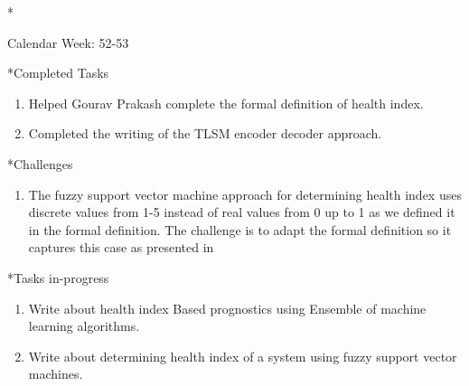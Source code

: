 \documentclass[11pt,a4paper]{article}
\begin{document}
\newpage
\begin{section}*{Calendar Week: 52-53 \hfill \date{30 December, 2020}}
 \begin{refsection}

       \begin{subsection}*{Completed Tasks}
             \begin{enumerate}
                   \item
                         Helped Gourav Prakash complete the formal definition of health index.
                   \item
                         Completed the writing of the TLSM encoder decoder approach.
             \end{enumerate}
       \end{subsection}

       \begin{subsection}*{Challenges}
             \begin{enumerate}
                   \item
                         The fuzzy support vector machine approach for determining health index uses discrete values from 1-5 instead
                         of real values from 0 up to 1 as we defined it in the formal definition. The challenge is to adapt the formal
                         definition so it captures this case as presented in \cite{6518966}
             \end{enumerate}
       \end{subsection}

       \begin{subsection}*{Tasks in-progress}
             \begin{enumerate}
                   \item
                         Write about health index Based prognostics using Ensemble of machine learning algorithms.
                   \item
                         Write about determining health index of a system using fuzzy support vector machines.
             \end{enumerate}
       \end{subsection}

       \printbibliography
 \end{refsection}
\end{section}
\end{document}
